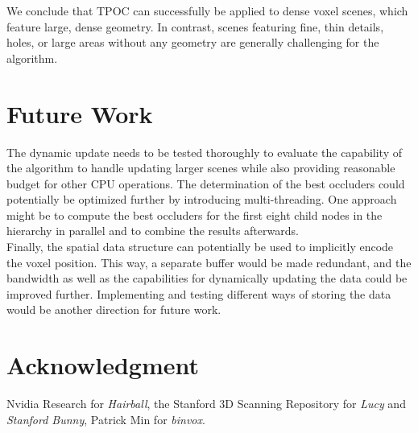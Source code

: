 \documentclass[conference]{IEEEtran}
\begin{document}
\noindent
We conclude that \ac{TPOC} can successfully be applied to dense voxel scenes, which feature large, dense 
geometry. In contrast, scenes featuring fine, thin details, holes, or large areas without any geometry are 
generally challenging for the algorithm.

\section{Future Work} \label{sec-future-work}

\noindent
The dynamic update needs to be tested thoroughly to evaluate the capability of the algorithm to handle updating 
larger scenes while also providing reasonable budget for other \ac{CPU} operations. The determination of the best 
occluders could potentially be optimized further by introducing multi-threading. One approach might be to 
compute the best occluders for the first eight child nodes in the hierarchy in parallel and to combine the results 
afterwards. \\


\noindent
Finally, the spatial data structure can potentially be used to implicitly encode the voxel position. This way, 
a separate buffer would be made redundant, and the bandwidth as well as the capabilities for dynamically updating 
the data could be improved further. Implementing and testing different ways of storing the data would be another 
direction for future work.

\section*{Acknowledgment} \label{section-acknowledgment}

\noindent
Nvidia Research for \emph{Hairball}, the Stanford 3D Scanning Repository for \emph{Lucy} 
and \emph{Stanford Bunny}, Patrick Min for \emph{binvox}.
\end{document}

